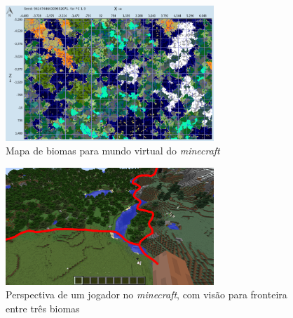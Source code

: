 \begin{figure}[H]
    \centering
    \includegraphics[width=0.7\textwidth]{figuras/chunkbasebiomes.png}
    \caption{Mapa de biomas para mundo virtual do \textit{minecraft}}
    \label{fig:chunkbasebiomes}
\end{figure}

\begin{figure}[H]
    \centering
    \includegraphics[width=0.7\textwidth]{figuras/biomesminecraftgameplay.png}
    \caption{Perspectiva de um jogador no \textit{minecraft}, com visão para fronteira entre três biomas}
    \label{fig:biomesminecraftgameplay}
\end{figure}
